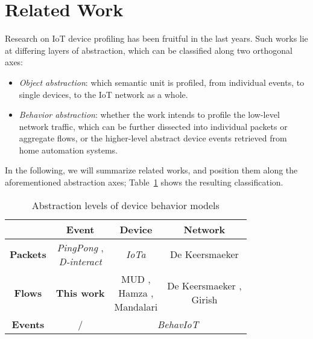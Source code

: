 \section{Related Work}
\label{sec:related-work}

Research on IoT device profiling has been fruitful in the last years.
Such works lie at differing layers of abstraction,
which can be classified along two orthogonal axes:
\begin{itemize}
    \item \emph{Object abstraction}: which semantic unit is profiled, from individual events,
    to single devices, to the IoT network as a whole.
    \item \emph{Behavior abstraction}: whether the work intends to profile the low-level network traffic,
    which can be further dissected into individual packets or aggregate flows,
    or the higher-level abstract device events retrieved from home automation systems.
\end{itemize}


In the following,
we will summarize related works,
and position them along the aforementioned abstraction axes;
Table~\ref{tab:abstraction} shows the resulting classification.

\begin{table}
    \centering
    \begin{tabular}{|c|c|c|c|}
        \cline{2-4}
        \multicolumn{1}{c|}{} & \textbf{Event} & \textbf{Device} & \textbf{Network} \\
        \hline
        \textbf{Packets} & \makecell{\emph{PingPong} \cite{ping-pong},\\\emph{D-interact} \cite{sun_inferring_2022}} & \emph{IoTa} \cite{duan_iota_2023} & De Keersmaeker \cite{smart-home-firewall} \\
        \hline
        \textbf{Flows}  & \textbf{This work} & \makecell{MUD \cite{mud},\\Hamza \cite{hamza_clear_2018},\\Mandalari \cite{blocking-without-breaking}} & \makecell{De Keersmaeker \cite{smart-home-firewall},\\Girish \cite{in-the-room}} \\
        \hline
        \textbf{Events} & / & \multicolumn{2}{c|}{\emph{BehavIoT} \cite{behaviot}} \\
        \hline
    \end{tabular}
    \caption{Abstraction levels of device behavior models}
    \label{tab:abstraction}
\end{table}

